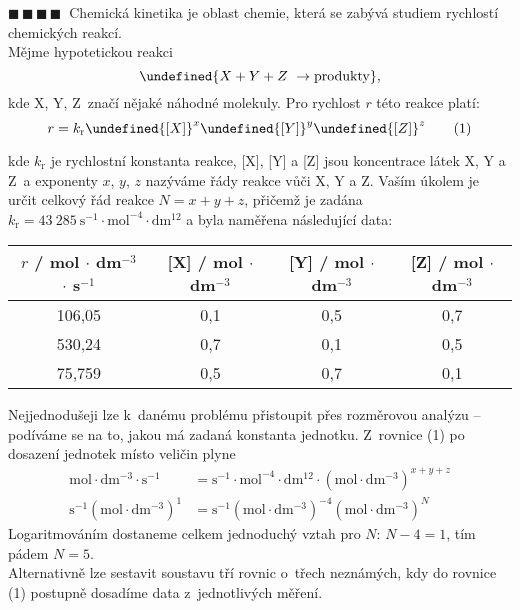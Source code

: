 \documentclass{book}
\let\ch\undefined
\newcommand{\ctyri}{$\blacksquare \, \blacksquare \, \blacksquare \, \blacksquare \; \; $}
\renewenvironment{quotation}{\par}{\par} %
\begin{document}
\hrulefill %
\begin{quotation}
\ctyri Chemická kinetika je oblast chemie, která se zabývá studiem rychlostí
chemických reakcí.\\Mějme hypotetickou reakci 
\[
\ch{X + Y + Z ~\rightarrow \mathrm{produkty}},
\]
kde X, Y, Z~značí nějaké náhodné molekuly. Pro rychlost $r$ této
reakce platí: 
\begin{equation}
r=k_{\mathrm{r}}\ch{[X]}^{x}\ch{[Y]}^{y}\ch{[Z]}^{z}\tag{1} 
\end{equation}

kde $k_{\mathrm{r}}$ je rychlostní konstanta reakce, {[}X{]}, {[}Y{]}
a {[}Z{]} jsou koncentrace látek X, Y a Z~a exponenty $x$, $y$,
$z$ nazýváme řády reakce vůči X, Y a Z. Vaším úkolem je určit celkový
řád reakce $N=x+y+z$, přičemž je zadána $k_{\mathrm{r}}=43~285~\mathrm{s^{-1}\cdot mol^{-4}\cdot dm^{12}}$
a byla naměřena následující data: 
\begin{center}
\begin{tabular}{c|c|c|c}
$r$ / mol $\cdot$ dm$^{-3}$ $\cdot$ s$^{-1}$ & {[}X{]} / mol $\cdot$ dm$^{-3}$ & {[}Y{]} / mol $\cdot$ dm$^{-3}$ & {[}Z{]} / mol $\cdot$ dm$^{-3}$\tabularnewline\hline\hline
106,05 & 0,1 & 0,5 & 0,7\tabularnewline\hline
530,24 & 0,7 & 0,1 & 0,5\tabularnewline\hline
75,759 & 0,5 & 0,7 & 0,1\tabularnewline\hline
\end{tabular}
\par\end{center}

\end{quotation} \dotfill \par 
Nejjednodušeji lze k~danému problému přistoupit přes rozměrovou analýzu -- podíváme se na to, jakou má zadaná konstanta jednotku.
Z~rovnice (1) po dosazení jednotek místo veličin plyne
\begin{align*}
\mathrm{mol\cdot dm^{-3}\cdot s^{-1}} & =\mathrm{s^{-1}\cdot mol^{-4}\cdot dm^{12}}\cdot(\mathrm{mol\cdot dm^{-3}})^{x+y+z}\\
\mathrm{s^{-1}}(\mathrm{mol\cdot dm^{-3}})^{1} & =\mathrm{s^{-1}}(\mathrm{mol\cdot dm^{-3}})^{-4}(\mathrm{mol\cdot dm^{-3}})^{N}
\end{align*}
Logaritmováním dostaneme celkem jednoduchý vztah pro $N$: $N-4=1$,
tím pádem $N=5$.\\
Alternativně lze sestavit soustavu tří rovnic o~třech neznámých,
kdy do rovnice (1) postupně dosadíme data z~jednotlivých měření.
\end{document}
